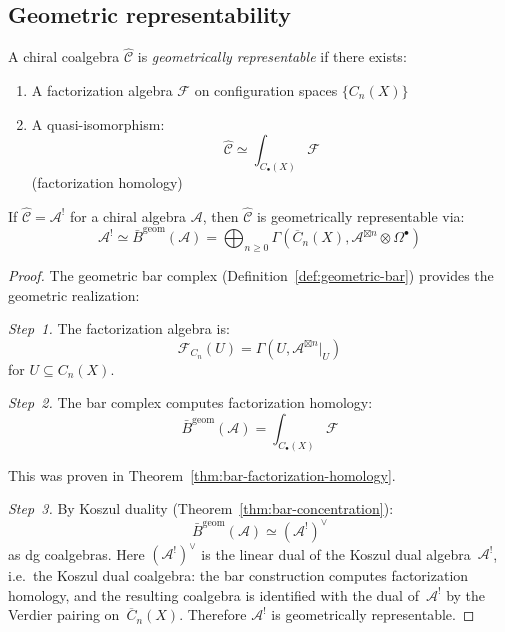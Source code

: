 \subsection{Geometric representability}

\begin{definition}\label{def:geom-representable-coalgebra}
A chiral coalgebra $\widehat{\mathcal{C}}$ is \emph{geometrically representable} 
if there exists:
\begin{enumerate}
\item A factorization algebra $\mathcal{F}$ on configuration spaces $\{C_n(X)\}$
\item A quasi-isomorphism:
      \[\widehat{\mathcal{C}} \simeq \int_{C_\bullet(X)} \mathcal{F}\]
      (factorization homology)
\end{enumerate}
\end{definition}

\begin{theorem}\label{thm:koszul-geom-rep}
If $\widehat{\mathcal{C}} = \mathcal{A}^!$ for a chiral algebra $\mathcal{A}$, then 
$\widehat{\mathcal{C}}$ is geometrically representable via:
\[\mathcal{A}^! \simeq \bar{B}^{\text{geom}}(\mathcal{A}) = 
\bigoplus_{n \geq 0} \Gamma\left(\overline{C}_n(X), \mathcal{A}^{\boxtimes n} 
\otimes \Omega^\bullet\right)\]
\end{theorem}

\begin{proof}
The geometric bar complex (Definition~\ref{def:geometric-bar}) provides the 
geometric realization:

\emph{Step~1.} The factorization algebra is:
\[\mathcal{F}_{C_n}(U) = \Gamma(U, \mathcal{A}^{\boxtimes n}|_U)\]
for $U \subseteq C_n(X)$.

\emph{Step~2.} The bar complex computes factorization homology:
\[\bar{B}^{\text{geom}}(\mathcal{A}) = \int_{C_\bullet(X)} \mathcal{F}\]

This was proven in Theorem~\ref{thm:bar-factorization-homology}.

\emph{Step~3.} By Koszul duality
(Theorem~\ref{thm:bar-concentration}):
\[\bar{B}^{\text{geom}}(\mathcal{A}) \simeq (\mathcal{A}^!)^\vee\]
as dg coalgebras.  Here $(\mathcal{A}^!)^\vee$ is the linear dual
of the Koszul dual algebra~$\mathcal{A}^!$, i.e.\ the Koszul dual
coalgebra: the bar construction computes factorization homology, and
the resulting coalgebra is identified with the dual of~$\mathcal{A}^!$
by the Verdier pairing on~$\overline{C}_n(X)$.  Therefore
$\mathcal{A}^!$ is geometrically representable.
\end{proof}

